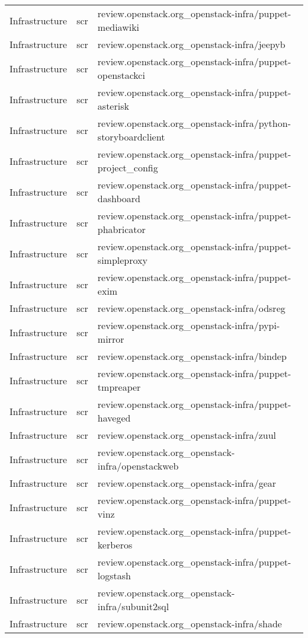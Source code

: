 \begin{center}
\begin{longtable}{|p{4cm}|p{1cm}|p{10cm}|}
Infrastructure&scr&review.openstack.org\_openstack-infra/puppet-mediawiki\\ 
Infrastructure&scr&review.openstack.org\_openstack-infra/jeepyb\\ 
Infrastructure&scr&review.openstack.org\_openstack-infra/puppet-openstackci\\ 
Infrastructure&scr&review.openstack.org\_openstack-infra/puppet-asterisk\\ 
Infrastructure&scr&review.openstack.org\_openstack-infra/python-storyboardclient\\ 
Infrastructure&scr&review.openstack.org\_openstack-infra/puppet-project\_config\\ 
Infrastructure&scr&review.openstack.org\_openstack-infra/puppet-dashboard\\ 
Infrastructure&scr&review.openstack.org\_openstack-infra/puppet-phabricator\\ 
Infrastructure&scr&review.openstack.org\_openstack-infra/puppet-simpleproxy\\ 
Infrastructure&scr&review.openstack.org\_openstack-infra/puppet-exim\\ 
Infrastructure&scr&review.openstack.org\_openstack-infra/odsreg\\ 
Infrastructure&scr&review.openstack.org\_openstack-infra/pypi-mirror\\ 
Infrastructure&scr&review.openstack.org\_openstack-infra/bindep\\ 
Infrastructure&scr&review.openstack.org\_openstack-infra/puppet-tmpreaper\\ 
Infrastructure&scr&review.openstack.org\_openstack-infra/puppet-haveged\\ 
Infrastructure&scr&review.openstack.org\_openstack-infra/zuul\\ 
Infrastructure&scr&review.openstack.org\_openstack-infra/openstackweb\\ 
Infrastructure&scr&review.openstack.org\_openstack-infra/gear\\ 
Infrastructure&scr&review.openstack.org\_openstack-infra/puppet-vinz\\ 
Infrastructure&scr&review.openstack.org\_openstack-infra/puppet-kerberos\\ 
Infrastructure&scr&review.openstack.org\_openstack-infra/puppet-logstash\\ 
Infrastructure&scr&review.openstack.org\_openstack-infra/subunit2sql\\ 
Infrastructure&scr&review.openstack.org\_openstack-infra/shade\\ 

\end{longtable}
\end{center}
